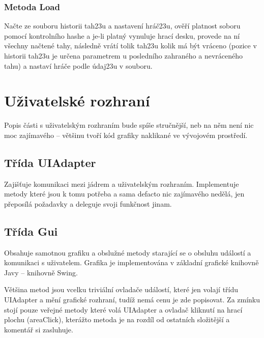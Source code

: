 \documentclass{article}
\begin{document}
\subsubsection{Metoda Load}
Na\v{c}te ze souboru historii tah\accent23u a nastaven\'i hr\'a\v{c}\accent23u, ov\v{e}\v{r}\'i platnost soboru pomoc\'i kontroln\'iho hashe a je-li platn\'y vynuluje hrac\'i desku, provede na n\'i v\v{s}echny na\v{c}ten\'e tahy, n\'asledn\v{e} vr\'at\'i tolik tah\accent23u kolik m\'a b\'yt vr\'aceno (pozice v historii tah\accent23u je ur\v{c}ena parametrem u posledn\'iho zahran\'eho a nevr\'acen\'eho  tahu) a nastav\'i hr\'a\v{c}e podle \'udaj\accent23u v souboru.








\section{U\v{z}ivatelsk\'e rozhran\'i}
Popis \v{c}\'asti s u\v{z}ivatelsk\'ym rozhran\'im bude sp\'i\v{s}e stru\v{c}n\v{e}j\v{s}\'i, neb na n\v{e}m nen\'i nic moc zaj\'imav\'eho – v\v{e}t\v{s}inu tvo\v{r}\'i k\'od grafiky naklikan\'e ve v\'yvojov\'em prost\v{r}ed\'i.



\subsection{T\v{r}\'ida UIAdapter}
Zaji\v{s}\v{t}uje komunikaci mezi j\'adrem a u\v{z}ivatelsk\'ym rozhran\'im. Implementuje metody kter\'e jsou k tomu pot\v{r}eba a sama defacto nic zaj\'imav\'eho ned\v{e}l\'a, jen p\v{r}epos\'il\'a po\v{z}adavky a deleguje svoji funk\v{c}nost jinam.



\subsection{T\v{r}\'ida Gui}
Obsahuje samotnou grafiku a obslu\v{z}n\'e metody staraj\'ic\'i se o obsluhu ud\'alost\'i a komunikaci s u\v{z}ivatelem. Grafika je implementov\'ana v z\'akladn\'i grafick\'e knihovn\v{e} Javy – knihovn\v{e} Swing.\medskip

V\v{e}t\v{s}ina metod jsou vcelku trivi\'aln\'i ovlada\v{c}e ud\'alost\'i, kter\'e jen volaj\'i t\v{r}\'idu UIAdapter a m\v{e}n\'i grafick\'e rozhran\'i, tud\'i\v{z} nem\'a cenu je zde popisovat. Za zm\'inku stoj\'i pouze ve\v{r}ejn\'e metody kter\'e vol\'a UIAdapter a ovlada\v{c} kliknut\'i na hrac\'i plochu (areaClick), kter\'a\v{z}to metoda je na rozd\'il od ostatn\'ich slo\v{z}it\v{e}j\v{s}\'i a koment\'a\v{r} si zasluhuje.
\end{document}
